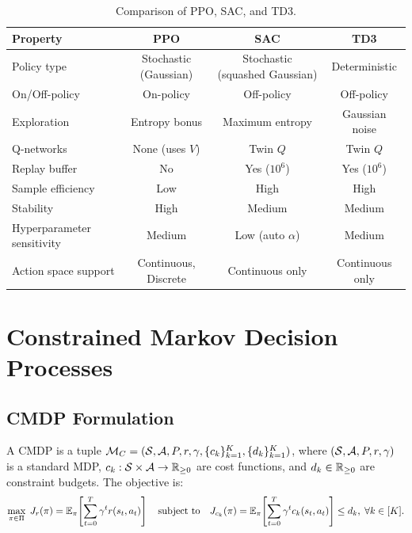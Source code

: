 \begin{table}[htbp]
\centering
\caption{Comparison of PPO, SAC, and TD3.}
\label{tab:algo_comparison}
\begin{tabular}{@{}lccc@{}}
\toprule
\textbf{Property} & \textbf{PPO} & \textbf{SAC} & \textbf{TD3} \\
\midrule
Policy type & Stochastic (Gaussian) & Stochastic (squashed Gaussian) & Deterministic \\
On/Off-policy & On-policy & Off-policy & Off-policy \\
Exploration & Entropy bonus & Maximum entropy & Gaussian noise \\
Q-networks & None (uses $V$) & Twin $Q$ & Twin $Q$ \\
Replay buffer & No & Yes ($10^6$) & Yes ($10^6$) \\
Sample efficiency & Low & High & High \\
Stability & High & Medium & Medium \\
Hyperparameter sensitivity & Medium & Low (auto $\alpha$) & Medium \\
Action space support & Continuous, Discrete & Continuous only & Continuous only \\
\bottomrule
\end{tabular}
\end{table}

\section{Constrained Markov Decision Processes}
\label{sec:cmdp_prelim}

\subsection{CMDP Formulation}

\begin{definition}
\label{def:cmdp}
A CMDP is a tuple $\mathcal{M}_C = (\mathcal{S}, \mathcal{A}, P, r, \gamma, \{c_k\}_{k=1}^{K}, \{d_k\}_{k=1}^{K})$, where $(\mathcal{S}, \mathcal{A}, P, r, \gamma)$ is a standard MDP, $c_k: \mathcal{S} \times \mathcal{A} \to \mathbb{R}_{\geq 0}$ are cost functions, and $d_k \in \mathbb{R}_{\geq 0}$ are constraint budgets. The objective is:
\begin{equation}
    \max_{\pi \in \Pi} \; J_r(\pi) = \mathbb{E}_\pi\!\left[\sum_{t=0}^{T} \gamma^t r(s_t, a_t)\right] \quad \text{subject to} \quad J_{c_k}(\pi) = \mathbb{E}_\pi\!\left[\sum_{t=0}^{T} \gamma^t c_k(s_t, a_t)\right] \leq d_k, \; \forall k \in [K].
    \label{eq:cmdp_def}
\end{equation}
\end{definition}

